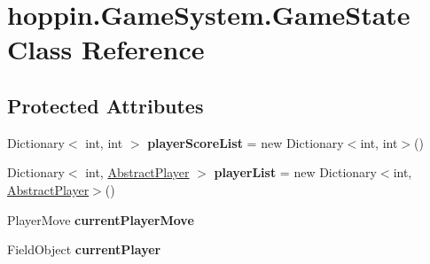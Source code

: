 \hypertarget{classhoppin_1_1_game_system_1_1_game_state}{}\section{hoppin.\+Game\+System.\+Game\+State Class Reference}
\label{classhoppin_1_1_game_system_1_1_game_state}
\subsection*{Protected Attributes}
\begin{DoxyCompactItemize}
\item 
Dictionary$<$ int, int $>$ {\bfseries player\+Score\+List} = new Dictionary$<$int, int$>$()\hypertarget{classhoppin_1_1_game_system_1_1_game_state_a53825e98ab71ec7ef82cda8625983ff0}{}\label{classhoppin_1_1_game_system_1_1_game_state_a53825e98ab71ec7ef82cda8625983ff0}

\item 
Dictionary$<$ int, \hyperlink{classhoppin_1_1_abstract_player}{Abstract\+Player} $>$ {\bfseries player\+List} = new Dictionary$<$int, \hyperlink{classhoppin_1_1_abstract_player}{Abstract\+Player}$>$()\hypertarget{classhoppin_1_1_game_system_1_1_game_state_aab55d74cf0026bf5fd7ef8b8ab6c8316}{}\label{classhoppin_1_1_game_system_1_1_game_state_aab55d74cf0026bf5fd7ef8b8ab6c8316}

\item 
Player\+Move {\bfseries current\+Player\+Move}\hypertarget{classhoppin_1_1_game_system_1_1_game_state_a34e4c930c267e3c1e8be2b33b1fb695b}{}\label{classhoppin_1_1_game_system_1_1_game_state_a34e4c930c267e3c1e8be2b33b1fb695b}

\item 
Field\+Object {\bfseries current\+Player}\hypertarget{classhoppin_1_1_game_system_1_1_game_state_a5057df7ffdb264f8835f209e1b882fc4}{}\label{classhoppin_1_1_game_system_1_1_game_state_a5057df7ffdb264f8835f209e1b882fc4}

\end{DoxyCompactItemize}
